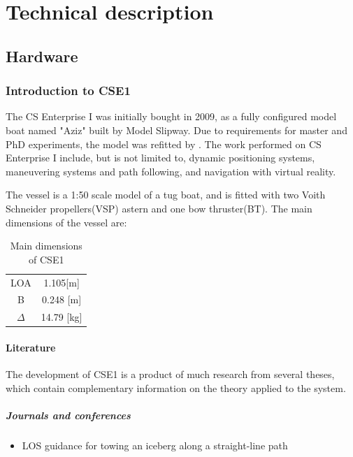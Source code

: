 \part{Technical description}
\chapter{Hardware}
\section{Introduction to CSE1}
The CS Enterprise I was initially bought in 2009, as a fully configured model boat named "Aziz" built by Model Slipway. Due to requirements for master and PhD experiments, the model was refitted by \cite{Skaatun2011}. The work performed on CS Enterprise I include, but is not limited to, dynamic positioning systems, maneuvering systems and path following, and navigation with virtual reality.

The vessel is a 1:50 scale model of a tug boat, and is fitted with two Voith Schneider propellers(VSP) astern and one bow thruster(BT). The main dimensions of the vessel are:
\begin{table}[h!]
	\caption{Main dimensions of CSE1}
	\centering
	\begin{tabular}{cc}
		\hline
		LOA & 1.105[m]\\
		B & 0.248 [m]\\
		$\Delta$ & 14.79 [kg]\\\hline
	\end{tabular}
\end{table}

\subsection{Literature}
The development of CSE1 is a product of much research from several theses, which contain complementary information on the theory applied to the system. 
\subsubsection{Journals and conferences}
\begin{itemize}
	\item LOS guidance for towing an iceberg along a straight-line path \citep{OrstenNorgrenSkjetne2014}
\end{itemize}
